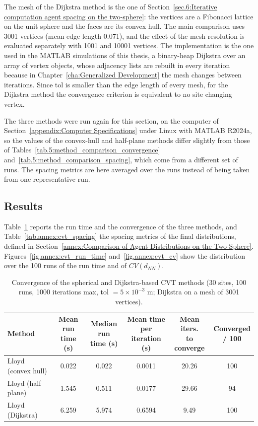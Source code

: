 The mesh of the Dijkstra method is the one of Section~\ref{sec.6:Iterative computation agent spacing on the two-sphere}: the vertices are a Fibonacci lattice on the unit sphere and the faces are its convex hull. The main comparison uses 3001 vertices (mean edge length 0.071), and the effect of the mesh resolution is evaluated separately with 1001 and 10001 vertices. The implementation is the one used in the MATLAB simulations of this thesis, a binary-heap Dijkstra over an array of vertex objects, whose adjacency lists are rebuilt in every iteration because in Chapter~\ref{cha:Generalized Development} the mesh changes between iterations. Since tol is smaller than the edge length of every mesh, for the Dijkstra method the convergence criterion is equivalent to no site changing vertex.

The three methods were run again for this section, on the computer of Section~\ref{appendix:Computer Specifications} under Linux with MATLAB R2024a, so the values of the convex-hull and half-plane methods differ slightly from those of Tables~\ref{tab.5:method_comparison_convergence} and~\ref{tab.5:method_comparison_spacing}, which come from a different set of runs. The spacing metrics are here averaged over the runs instead of being taken from one representative run.

\subsection{Results}

Table~\ref{tab.annex:cvt_convergence} reports the run time and the convergence of the three methods, and Table~\ref{tab.annex:cvt_spacing} the spacing metrics of the final distributions, defined in Section~\ref{annex:Comparison of Agent Distributions on the Two-Sphere}. Figures~\ref{fig.annex:cvt_run_time} and~\ref{fig.annex:cvt_cv} show the distribution over the 100 runs of the run time and of $CV(d_{NN})$.

\begin{table}[htbp]
\centering
\caption[Convergence of the spherical and Dijkstra-based CVT methods]{Convergence of the spherical and Dijkstra-based \gls{CVT} methods (30 sites, 100 runs, 1000 iterations max, tol $=5\times10^{-3}$ m; Dijkstra on a mesh of 3001 vertices).}
\label{tab.annex:cvt_convergence}
\small\setlength{\tabcolsep}{4pt}
\begin{tabular}{lccccc}
\toprule
Method & \makecell{Mean run\\time (s)} & \makecell{Median run\\time (s)} & \makecell{Mean time per\\iteration (s)} & \makecell{Mean iters.\\to converge} & \makecell{Converged\\/ 100} \\
\midrule
Lloyd (convex hull) & 0.022 & 0.022 & 0.0011 & 20.26 & 100 \\
Lloyd (half plane)  & 1.545 & 0.511 & 0.0177 & 29.66 & 94 \\
Lloyd (Dijkstra)    & 6.259 & 5.974 & 0.6594 & 9.49  & 100 \\
\bottomrule
\end{tabular}
\end{table}

